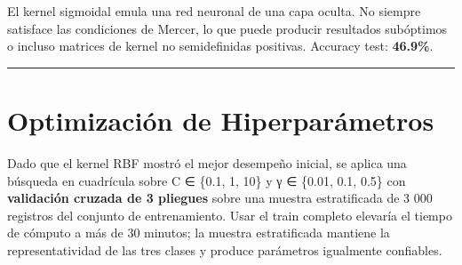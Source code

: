 \documentclass[
]{article}
\newenvironment{Shaded}{\begin{snugshade}}{\end{snugshade}}
\newcommand{\AttributeTok}[1]{\textcolor[rgb]{0.13,0.29,0.53}{#1}}
\newcommand{\CommentTok}[1]{\textcolor[rgb]{0.56,0.35,0.01}{\textit{#1}}}
\newcommand{\ConstantTok}[1]{\textcolor[rgb]{0.56,0.35,0.01}{#1}}
\newcommand{\DecValTok}[1]{\textcolor[rgb]{0.00,0.00,0.81}{#1}}
\newcommand{\FloatTok}[1]{\textcolor[rgb]{0.00,0.00,0.81}{#1}}
\newcommand{\FunctionTok}[1]{\textcolor[rgb]{0.13,0.29,0.53}{\textbf{#1}}}
\newcommand{\NormalTok}[1]{#1}
\newcommand{\OtherTok}[1]{\textcolor[rgb]{0.56,0.35,0.01}{#1}}
\newcommand{\SpecialCharTok}[1]{\textcolor[rgb]{0.81,0.36,0.00}{\textbf{#1}}}
\newcommand{\StringTok}[1]{\textcolor[rgb]{0.31,0.60,0.02}{#1}}
\begin{document}
El kernel sigmoidal emula una red neuronal de una capa oculta. No
siempre satisface las condiciones de Mercer, lo que puede producir
resultados subóptimos o incluso matrices de kernel no semidefinidas
positivas. Accuracy test: \textbf{46.9\%}.

\begin{center}\rule{0.5\linewidth}{0.5pt}\end{center}

\section{Optimización de
Hiperparámetros}\label{optimizaciuxf3n-de-hiperparuxe1metros}

Dado que el kernel RBF mostró el mejor desempeño inicial, se aplica una
búsqueda en cuadrícula sobre C ∈ \{0.1, 1, 10\} y γ ∈ \{0.01, 0.1, 0.5\}
con \textbf{validación cruzada de 3 pliegues} sobre una muestra
estratificada de 3 000 registros del conjunto de entrenamiento. Usar el
train completo elevaría el tiempo de cómputo a más de 30 minutos; la
muestra estratificada mantiene la representatividad de las tres clases y
produce parámetros igualmente confiables.

\begin{Shaded}
\end{Shaded}
\end{document}
